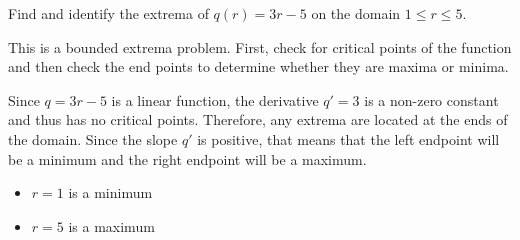 \documentclass{ximera}
\author{Emma Smith Zbarsky}
\begin{document}
\begin{exercise}

Find and identify the extrema of $q(r) = 3r-5$ on the domain
$1 \leq r \leq 5$.


\begin{hint}
This is a bounded extrema problem. First, check for critical points of
the function and then check the end points to determine whether they are
maxima or minima.
\end{hint}


\begin{hint}
Since $q= 3r-5$ is a linear function, the derivative $q' = 3$ is a
non-zero constant and thus has no critical points. Therefore, any
extrema are located at the ends of the domain. Since the slope $q'$ is
positive, that means that the left endpoint will be a minimum and the
right endpoint will be a maximum.

\begin{itemize}
\item
  $r=1$ is a minimum
\item
  $r=5$ is a maximum
\end{itemize}
\end{hint}


\begin{multipleChoice}
\end{multipleChoice}

\end{exercise}
\end{document}
